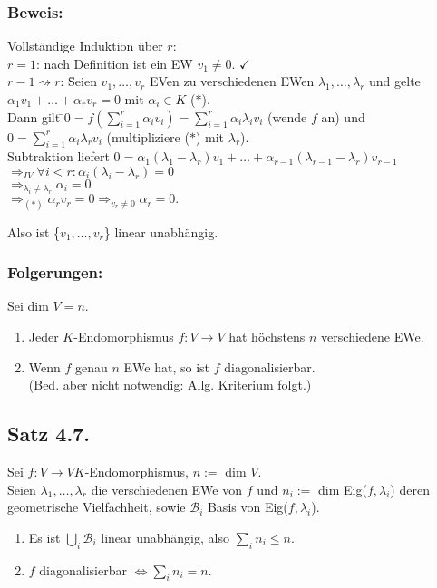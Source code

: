 \documentclass[a4paper, 12pt]{extarticle}
\begin{document}
\subsubsection*{Beweis:}
\begin{tabbing}
Vollständige Induktion über $r$:\\
$r = 1$: nach Definition ist ein EW $v_1 \neq 0$. $\checkmark$\\
$r - 1 \rightsquigarrow r$: \=Seien $v_1, \dots, v_r$ EVen zu verschiedenen EWen $\lambda_1, \dots, \lambda_r$ und gelte\\ \>$\alpha_1 v_1 + \dots + \alpha_r v_r = 0$ mit $\alpha_i \in K$ ($\ast$).\\
\>Dann gilt \=$0 = f(\sum_{i=1}^{r} \alpha_i v_i) = \sum_{i=1}^{r} \alpha_i \lambda_i v_i$ (wende $f$ an)
und\\ \>\>$0 = \sum_{i=1}^{r} \alpha_i \lambda_r v_i$ (multipliziere ($\ast$) mit $\lambda_r$).\\
\>Subtraktion liefert $0 = \alpha_1(\lambda_1 - \lambda_r) v_1 + \dots + \alpha_{r-1} (\lambda_{r-1} - \lambda_r) v_{r-1}$\\ \>$\Rightarrow_{IV} \forall i<r: \alpha_i (\lambda_i - \lambda_r) = 0$\\ \>$\Rightarrow_{\lambda_i \neq \lambda_r} \alpha_i = 0$\\ \>$\Rightarrow_{(\ast)} \alpha_r v_r = 0 \Rightarrow_{v_r \neq 0} \alpha_r = 0.$
\end{tabbing}
Also ist \{$v_1, \dots, v_r$\} linear unabhängig.\\
\subsubsection*{Folgerungen:}
Sei dim $V = n$.
\begin{enumerate}[label=\alph*)]
	\item Jeder $K$-Endomorphismus $f:V\longrightarrow V$ hat höchstens $n$ verschiedene EWe.
	\item Wenn $f$ genau $n$ EWe hat, so ist $f$ diagonalisierbar.\\ (Bed. aber nicht notwendig: Allg. Kriterium folgt.)
\end{enumerate}

\subsection*{Satz 4.7.}
Sei $f:V\longrightarrow V K$-Endomorphismus, $n :=$ dim $V$.\\
Seien $\lambda_1, \dots, \lambda_r$ die verschiedenen EWe von $f$ und $n_i :=$ dim Eig($f, \lambda_i$) deren geometrische Vielfachheit, sowie $\mathcal{B}_i$ Basis von Eig($f, \lambda_i$).
\begin{enumerate} [label = \alph*)]
	\item Es ist $\bigcup_i \mathcal{B}_i$ linear unabhängig, also $\sum_{i} n_i \leq n$.
	\item $f$ diagonalisierbar $\Leftrightarrow \sum_i n_i = n$.
\end{enumerate}
\end{document}
